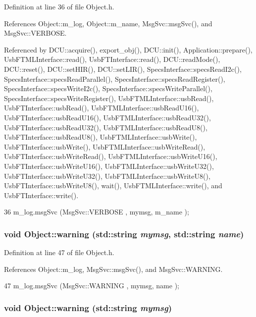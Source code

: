 Definition at line 36 of file Object.h.

References Object::m\_\-log, Object::m\_\-name, MsgSvc::msgSvc(), and MsgSvc::VERBOSE.

Referenced by DCU::acquire(), export\_\-obj(), DCU::init(), Application::prepare(), UsbFTMLInterface::read(), UsbFTInterface::read(), DCU::readMode(), DCU::reset(), DCU::setHIR(), DCU::setLIR(), SpecsInterface::specsReadI2c(), SpecsInterface::specsReadParallel(), SpecsInterface::specsReadRegister(), SpecsInterface::specsWriteI2c(), SpecsInterface::specsWriteParallel(), SpecsInterface::specsWriteRegister(), UsbFTMLInterface::usbRead(), UsbFTInterface::usbRead(), UsbFTMLInterface::usbReadU16(), UsbFTInterface::usbReadU16(), UsbFTMLInterface::usbReadU32(), UsbFTInterface::usbReadU32(), UsbFTMLInterface::usbReadU8(), UsbFTInterface::usbReadU8(), UsbFTMLInterface::usbWrite(), UsbFTInterface::usbWrite(), UsbFTMLInterface::usbWriteRead(), UsbFTInterface::usbWriteRead(), UsbFTMLInterface::usbWriteU16(), UsbFTInterface::usbWriteU16(), UsbFTMLInterface::usbWriteU32(), UsbFTInterface::usbWriteU32(), UsbFTMLInterface::usbWriteU8(), UsbFTInterface::usbWriteU8(), wait(), UsbFTMLInterface::write(), and UsbFTInterface::write().


\begin{DoxyCode}
36 { m_log.msgSvc (MsgSvc::VERBOSE , mymsg, m_name ); }
\end{DoxyCode}
\hypertarget{classObject_a11f101db4dd73d9391b0231818881d86}{
\subsubsection[{warning}]{\setlength{\rightskip}{0pt plus 5cm}void Object::warning (std::string {\em mymsg}, \/  std::string {\em name})}}
\label{classObject_a11f101db4dd73d9391b0231818881d86}


Definition at line 47 of file Object.h.

References Object::m\_\-log, MsgSvc::msgSvc(), and MsgSvc::WARNING.


\begin{DoxyCode}
47 { m_log.msgSvc (MsgSvc::WARNING , mymsg, name ); }
\end{DoxyCode}
\hypertarget{classObject_a65cd4fda577711660821fd2cd5a3b4c9}{
\subsubsection[{warning}]{\setlength{\rightskip}{0pt plus 5cm}void Object::warning (std::string {\em mymsg})}}
\label{classObject_a65cd4fda577711660821fd2cd5a3b4c9}


